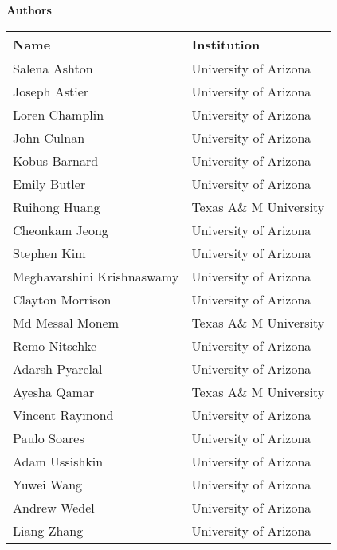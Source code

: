 \begin{center}

    \bigskip

    \textbf{Authors}

    \bigskip

    \begin{tabular}{ll}
        \toprule
        Name                       & Institution \\\midrule
        Salena Ashton              & University of Arizona\\
        Joseph Astier              & University of Arizona\\
        Loren Champlin             & University of Arizona\\
        John Culnan                & University of Arizona\\
        Kobus Barnard              & University of Arizona\\
        Emily Butler               & University of Arizona\\
        Ruihong Huang              & Texas A\& M University \\
        Cheonkam Jeong             & University of Arizona\\
        Stephen Kim                & University of Arizona\\
        Meghavarshini Krishnaswamy & University of Arizona\\
        Clayton Morrison           & University of Arizona\\
        Md Messal Monem            & Texas A\& M University \\
        Remo Nitschke              & University of Arizona\\
        Adarsh Pyarelal            & University of Arizona\\
        Ayesha Qamar               & Texas A\& M University \\
        Vincent Raymond            & University of Arizona\\
        Paulo Soares               & University of Arizona\\
        Adam Ussishkin             & University of Arizona\\
        Yuwei Wang                 & University of Arizona\\
        Andrew Wedel               & University of Arizona\\
        Liang Zhang                & University of Arizona\\
        \bottomrule
    \end{tabular}
\end{center}

